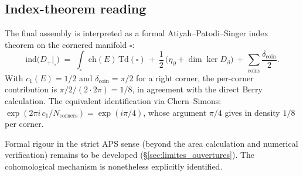 \subsection{Index-theorem reading}
\label{sec:indice_APS}

The final assembly is interpreted as a formal
Atiyah--Patodi--Singer index theorem \cite{APS1975} on the cornered
manifold $\square$:
\begin{equation}
\mathrm{ind}\!\big(D_+|_\square\big) \;=\; \int_{\square} \mathrm{ch}(E)\,\mathrm{Td}(\square) \,+\, \dfrac{1}{2}\,\big(\eta_{\partial} + \dim \ker D_\partial\big) \,+\, \sum_{\mathrm{coins}} \dfrac{\delta_{\mathrm{coin}}}{2}.
\label{eq:APS}
\end{equation}
With $c_1(E) = 1/2$ and $\delta_{\mathrm{coin}} = \pi/2$ for a right
corner, the per-corner contribution is $\pi/2 / (2 \cdot 2\pi) = 1/8$,
in agreement with the direct Berry calculation. The equivalent
identification via Chern--Simons:
$\exp(2\pi i\,c_1/N_{\mathrm{corners}}) = \exp(i\pi/4)$, whose argument
$\pi/4$ gives in density $1/8$ per corner.

Formal rigour in the strict APS sense (beyond the area calculation
and numerical verification) remains to be developed
(\S\ref{sec:limites_ouvertures}). The cohomological mechanism is
nonetheless explicitly identified.

